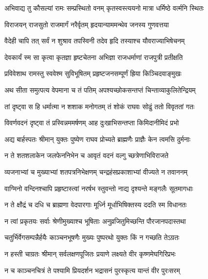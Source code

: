 
\twolineshloka
{अभिवाद्य तु कौसल्यां रामः सम्प्रस्थितो वनम्}
{कृतस्वस्त्ययनो मात्रा धर्मिष्ठे वर्त्मनि स्थितः} %

\twolineshloka
{विराजयन् राजसुतो राजमार्गं नरैर्वृतम्}
{हृदयान्याममन्थेव जनस्य गुणवत्तया} %

\twolineshloka
{वैदेही चापि तत् सर्वं न शुश्राव तपस्विनी}
{तदेव हृदि तस्याश्च यौवराज्याभिषेचनम्} %

\twolineshloka
{देवकार्यं स्म सा कृत्वा कृतज्ञा हृष्टचेतना}
{अभिज्ञा राजधर्माणां राजपुत्री प्रतीक्षति} %

\twolineshloka
{प्रविवेशाथ रामस्तु स्ववेश्म सुविभूषितम्}
{प्रहृष्टजनसम्पूर्णं ह्रिया किञ्चिदवाङ्मुखः} %

\twolineshloka
{अथ सीता समुत्पत्य वेपमाना च तं पतिम्}
{अपश्यच्छोकसन्तप्तं चिन्ताव्याकुलितेन्द्रियम्} %

\twolineshloka
{तां दृष्ट्वा स हि धर्मात्मा न शशाक मनोगतम्}
{तं शोकं राघवः सोढुं ततो विवृततां गतः} %

\twolineshloka
{विवर्णवदनं दृष्ट्वा तं प्रस्विन्नममर्षणम्}
{आह दुःखाभिसन्तप्ता किमिदानीमिदं प्रभो} %

\twolineshloka
{अद्य बार्हस्पतः श्रीमान् युक्तः पुष्येण राघव}
{प्रोच्यते ब्राह्मणैः प्राज्ञैः केन त्वमसि दुर्मनाः} %

\twolineshloka
{न ते शतशलाकेन जलफेननिभेन च}
{आवृतं वदनं वल्गु च्छत्रेणाभिविराजते} %

\twolineshloka
{व्यजनाभ्यां च मुख्याभ्यां शतपत्रनिभेक्षणम्}
{चन्द्रहंसप्रकाशाभ्यां वीज्यते न तवाननम्} %

\twolineshloka
{वाग्मिनो वन्दिनश्चापि प्रहृष्टास्त्वां नरर्षभ}
{स्तुवन्तो नाद्य दृश्यन्ते मङ्गलैः सूतमागधाः} %

\twolineshloka
{न ते क्षौद्रं च दधि च ब्राह्मणा वेदपारगाः}
{मूर्ध्नि मूर्धाभिषिक्तस्य ददति स्म विधानतः} %

\twolineshloka
{न त्वां प्रकृतयः सर्वाः श्रेणीमुख्याश्च भूषिताः}
{अनुव्रजितुमिच्छन्ति पौरजानपदास्तथा} %

\twolineshloka
{चतुर्भिर्वेगसम्पन्नैर्हयैः काञ्चनभूषणैः}
{मुख्यः पुष्परथो युक्तः किं न गच्छति तेऽग्रतः} %

\twolineshloka
{न हस्ती चाग्रतः श्रीमान् सर्वलक्षणपूजितः}
{प्रयाणे लक्ष्यते वीर कृष्णमेघगिरिप्रभः} %

\twolineshloka
{न च काञ्चनचित्रं ते पश्यामि प्रियदर्शन}
{भद्रासनं पुरस्कृत्य यान्तं वीर पुरःसरम्} %

